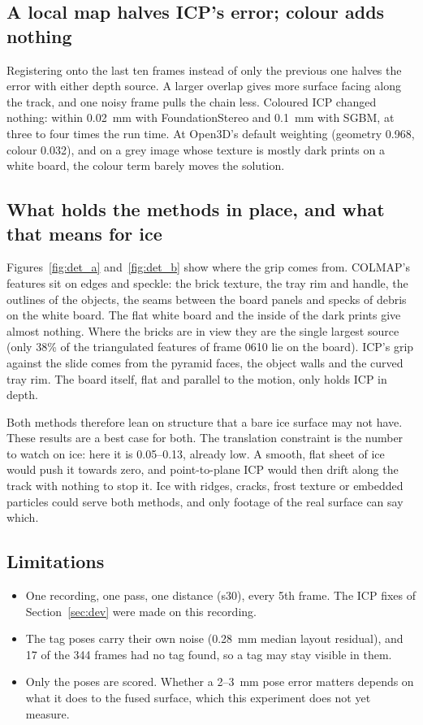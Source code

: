 \subsection{A local map halves ICP's error; colour adds nothing}
Registering onto the last ten frames instead of only the previous one halves the error with either depth source.
A larger overlap gives more surface facing along the track, and one noisy frame pulls the chain less. Coloured ICP
changed nothing: within 0.02~mm with FoundationStereo and 0.1~mm with SGBM, at three to four times the run time.
At Open3D's default weighting (geometry 0.968, colour 0.032), and on a grey image whose texture is mostly dark
prints on a white board, the colour term barely moves the solution.

\subsection{What holds the methods in place, and what that means for ice}
Figures~\ref{fig:det_a} and~\ref{fig:det_b} show where the grip comes from. COLMAP's features sit on edges and
speckle: the brick texture, the tray rim and handle, the outlines of the objects, the seams between the board
panels and specks of debris on the white board. The flat white board and the inside of the dark prints give
almost nothing. Where the bricks are in view they are the single largest source (only 38\% of the triangulated
features of frame 0610 lie on the board). ICP's grip against the slide comes from the pyramid faces, the object
walls and the curved tray rim. The board itself, flat and parallel to the motion, only holds ICP in depth.

Both methods therefore lean on structure that a bare ice surface may not have. These results are a best case
for both. The translation constraint is the number to watch on ice: here it is 0.05--0.13, already low. A
smooth, flat sheet of ice would push it towards zero, and point-to-plane ICP would then drift along the track
with nothing to stop it. Ice with ridges, cracks, frost texture or embedded particles could serve both methods,
and only footage of the real surface can say which.

\subsection{Limitations}
\begin{itemize}
\item One recording, one pass, one distance (s30), every 5th frame. The ICP fixes of Section~\ref{sec:dev} were
made on this recording.
\item The tag poses carry their own noise (0.28~mm median layout residual), and 17 of the 344 frames had no tag
found, so a tag may stay visible in them.
\item Only the poses are scored. Whether a 2--3~mm pose error matters depends on what it does to the fused
surface, which this experiment does not yet measure.
\end{itemize}

